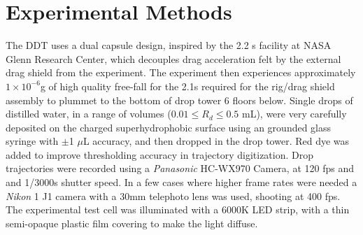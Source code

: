 \documentclass[12pt,a4paper,oneside]{book}
\begin{document}
\section{Experimental Methods}
The DDT uses a dual capsule design, inspired by the 2.2 s facility at NASA Glenn Research Center, which decouples drag acceleration felt by the external drag shield from the experiment. The experiment then experiences approximately $1 \times 10^{-6}$g of high quality free-fall for the 2.1s required for the rig/drag shield assembly to plummet to the bottom of drop tower 6 floors below. Single drops of distilled water, in a range of volumes ($0.01 \leq R_d \leq 0.5$ mL), were very carefully deposited on the charged superhydrophobic surface using an grounded glass syringe with $\pm $1 $\mu$L accuracy, and then dropped in the drop tower. Red dye was added to improve thresholding accuracy in trajectory digitization. Drop trajectories were recorded using a \emph{Panasonic} HC-WX970 Camera, at 120 fps and and 1/3000s shutter speed. In a few cases where higher frame rates were needed a \emph{Nikon} 1 J1 camera with a 30mm telephoto lens was used, shooting at 400 fps. The experimental test cell was illuminated with a 6000K LED strip, with a thin semi-opaque plastic film covering to make the light diffuse.  
\end{document}
